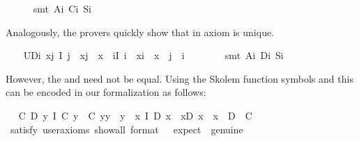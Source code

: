\begin{isabellebody}
%
\isadelimproof
\ \ \ \ %
\endisadelimproof
%
\isatagproof
{}\isamarkupfalse%
\ {\isacharparenleft}smt\ A\isactrlsub i\ C\isactrlsub i\ S\isactrlsub i{\isacharparenright}%
\endisatagproof
{\isafoldproof}%
%
\isadelimproof
%
\endisadelimproof
%
\begin{isamarkuptext}%
Analogously, the provers quickly show that  in axiom  is unique.%
\end{isamarkuptext}\isamarkuptrue%
\ \ \isamarkupfalse%
\ UD\isactrlsub i{\isacharcolon}\ {\isachardoublequoteopen}\isactrlbold {\isasymforall}x{\isachardot}\isactrlbold {\isasymexists}j{\isachardot}\ I\ j\ \isactrlbold {\isasymand}\ x{\isasymcdot}j\ {\isasymcong}\ x\ \isactrlbold {\isasymand}\ {\isacharparenleft}\isactrlbold {\isasymforall}i{\isachardot}{\isacharparenleft}I\ i\ \isactrlbold {\isasymand}\ x{\isasymcdot}i\ {\isasymcong}\ x{\isacharparenright}\ \isactrlbold {\isasymrightarrow}\ j\ {\isasymcong}\ i{\isacharparenright}{\isachardoublequoteclose}\ \ \isanewline
%
\isadelimproof
\ \ \ \ %
\endisadelimproof
%
\isatagproof
{}\isamarkupfalse%
\ {\isacharparenleft}smt\ A\isactrlsub i\ D\isactrlsub i\ S\isactrlsub i{\isacharparenright}%
\endisatagproof
{\isafoldproof}%
%
\isadelimproof
%
\endisadelimproof
%
\begin{isamarkuptext}%
However, the  and  need not be equal. Using the Skolem 
   function symbols  and  this can be encoded in
   our formalization as follows:%
\end{isamarkuptext}\isamarkuptrue%
\ \isamarkupfalse%
\ {\isachardoublequoteopen}{\isacharparenleft}{\isasymexists}C\ D{\isachardot}\ {\isacharparenleft}\isactrlbold {\isasymforall}y{\isachardot}\ I\ {\isacharparenleft}C\ y{\isacharparenright}\ \isactrlbold {\isasymand}\ {\isacharparenleft}C\ y{\isacharparenright}{\isasymcdot}y\ {\isasymcong}\ y{\isacharparenright}\ \isactrlbold {\isasymand}\ {\isacharparenleft}\isactrlbold {\isasymforall}x{\isachardot}\ I\ {\isacharparenleft}D\ x{\isacharparenright}\ \isactrlbold {\isasymand}\ x{\isasymcdot}{\isacharparenleft}D\ x{\isacharparenright}\ {\isasymcong}\ x{\isacharparenright}\ \isactrlbold {\isasymand}\ \isactrlbold {\isasymnot}{\isacharparenleft}D\ \isactrlbold {\isacharequal}\ C{\isacharparenright}{\isacharparenright}{\isachardoublequoteclose}\isanewline
\ \ \ \isamarkupfalse%
\ {\isacharbrackleft}satisfy{\isacharcomma}\ user{\isacharunderscore}axioms{\isacharcomma}\ show{\isacharunderscore}all{\isacharcomma}\ format\ {\isacharequal}\ {}{\isacharcomma}\ expect\ {\isacharequal}\ genuine{\isacharbrackright}%

\end{isabellebody}
